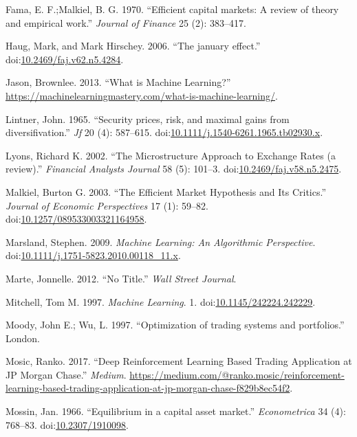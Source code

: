 \documentclass[]{article}
\begin{document}
\hypertarget{ref-Fama1970}{}
Fama, E. F.;Malkiel, B. G. 1970. ``Efficient capital markets: A review
of theory and empirical work.'' \emph{Journal of Finance} 25 (2):
383--417.

\hypertarget{ref-Haug2006}{}
Haug, Mark, and Mark Hirschey. 2006. ``The january effect.''
doi:\href{https://doi.org/10.2469/faj.v62.n5.4284}{10.2469/faj.v62.n5.4284}.

\hypertarget{ref-Jason2013}{}
Jason, Brownlee. 2013. ``What is Machine Learning?''
\url{https://machinelearningmastery.com/what-is-machine-learning/}.

\hypertarget{ref-Lintner1965}{}
Lintner, John. 1965. ``Security prices, risk, and maximal gains from
diversifivation.'' \emph{Jf} 20 (4): 587--615.
doi:\href{https://doi.org/10.1111/j.1540-6261.1965.tb02930.x}{10.1111/j.1540-6261.1965.tb02930.x}.

\hypertarget{ref-Lyons2002}{}
Lyons, Richard K. 2002. ``The Microstructure Approach to Exchange Rates
(a review).'' \emph{Financial Analysts Journal} 58 (5): 101--3.
doi:\href{https://doi.org/10.2469/faj.v58.n5.2475}{10.2469/faj.v58.n5.2475}.

\hypertarget{ref-Malkiel2003}{}
Malkiel, Burton G. 2003. ``The Efficient Market Hypothesis and Its
Critics.'' \emph{Journal of Economic Perspectives} 17 (1): 59--82.
doi:\href{https://doi.org/10.1257/089533003321164958}{10.1257/089533003321164958}.

\hypertarget{ref-Marsland2009}{}
Marsland, Stephen. 2009. \emph{Machine Learning: An Algorithmic
Perspective}.
doi:\href{https://doi.org/10.1111/j.1751-5823.2010.00118_11.x}{10.1111/j.1751-5823.2010.00118\_11.x}.

\hypertarget{ref-Marte2012}{}
Marte, Jonnelle. 2012. ``No Title.'' \emph{Wall Street Journal}.

\hypertarget{ref-Mitchell1997}{}
Mitchell, Tom M. 1997. \emph{Machine Learning}. 1.
doi:\href{https://doi.org/10.1145/242224.242229}{10.1145/242224.242229}.

\hypertarget{ref-MoodyWu1997}{}
Moody, John E.; Wu, L. 1997. ``Optimization of trading systems and
portfolios.'' London.

\hypertarget{ref-Mosic2017}{}
Mosic, Ranko. 2017. ``Deep Reinforcement Learning Based Trading
Application at JP Morgan Chase.'' \emph{Medium}.
\url{https://medium.com/@ranko.mosic/reinforcement-learning-based-trading-application-at-jp-morgan-chase-f829b8ec54f2}.

\hypertarget{ref-Mossin1966}{}
Mossin, Jan. 1966. ``Equilibrium in a capital asset market.''
\emph{Econometrica} 34 (4): 768--83.
doi:\href{https://doi.org/10.2307/1910098}{10.2307/1910098}.
\end{document}
